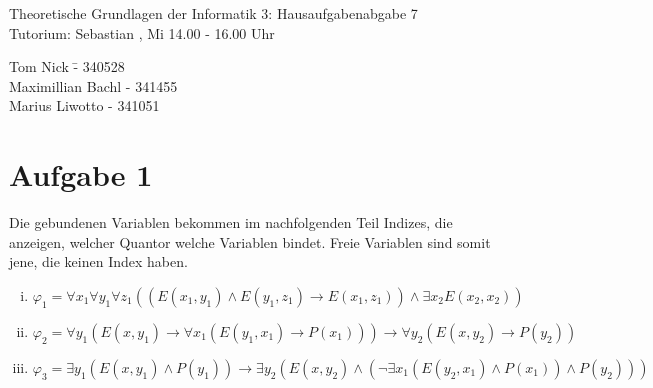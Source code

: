 \documentclass[a4paper,10pt]{article}
\begin{document}
\begin{center}
\Large{Theoretische Grundlagen der Informatik 3: Hausaufgabenabgabe 7} \\
\large{Tutorium: Sebastian , Mi 14.00 - 16.00 Uhr}
\end{center}
\begin{tabbing}
Tom Nick \hspace{2cm}\= - 340528\\
Maximillian Bachl \> - 341455 \\
Marius Liwotto\> -  341051
\end{tabbing}
\section*{Aufgabe 1}
Die gebundenen Variablen bekommen im nachfolgenden Teil Indizes, die anzeigen, welcher Quantor welche Variablen bindet. Freie Variablen sind somit jene, die keinen Index haben.
\begin{enumerate}[(i)]
\item
$$\varphi_1 = \forall x_1 \forall y_1 \forall z_1 \left(\left( E(x_1,y_1) \land E(y_1,z_1) \rightarrow E(x_1,z_1) \right) \land \exists x_2 E(x_2,x_2) \right)$$
\item
$$\varphi_2 = \forall y_1 ( E(x,y_1) \rightarrow \forall x_1 (E(y_1,x_1) \rightarrow P(x_1))) \rightarrow \forall y_2 (E(x,y_2) \rightarrow P(y_2))$$
\item
$$\varphi_3 = \exists y_1 (E(x,y_1) \land P(y_1)) \to \exists y_2 (E(x,y_2) \land (\lnot \exists x_1(E(y_2,x_1) \land P(x_1)) \land P(y_2)))$$
\end{enumerate}
\end{document}
